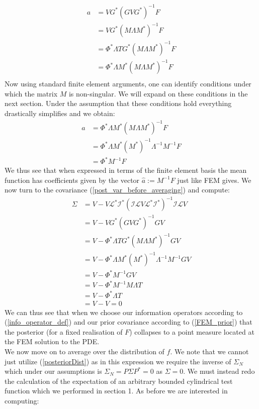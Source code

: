 \documentclass{article}
\theoremstyle{definition}
\theoremstyle{remark}
\begin{document}
\begin{align*}
    a &= VG^{*}(GVG^{*})^{-1}F \\
    &= VG^{*}(M\Lambda M^{*})^{-1}F \\
    &= \Phi^{*}\Lambda TG^{*}(M\Lambda M^{*})^{-1}F \\
    &= \Phi^{*}\Lambda M^{*}(M\Lambda M^{*})^{-1}F \\
\end{align*}
Now using standard finite element arguments, one can identify conditions under which the matrix $M$ is non-singular. We will expand on these conditions in the next section. Under the assumption that these conditions hold everything drastically simplifies and we obtain:
\begin{align*}
    a &= \Phi^{*}\Lambda M^{*}(M\Lambda M^{*})^{-1}F \\
    &= \Phi^{*}\Lambda M^{*}(M^{*})^{-1}\Lambda^{-1}M^{-1}F \\
    &= \Phi^{*}M^{-1}F
\end{align*}
We thus see that when expressed in terms of the finite element basis the mean function has coefficients given by the vector $\hat{a}:=M^{-1}F$ just like FEM gives. We now turn to the covariance (\ref{post_var_before_averaging}) and compute:
\begin{align*}
    \Sigma &= V -V\mathcal{L}^{*}\mathcal{I}^{*}(\mathcal{I}\mathcal{L}V\mathcal{L}^{*}\mathcal{I}^{*})^{-1}\mathcal{I}\mathcal{L}V \\
    &= V - VG^{*}(GVG^{*})^{-1}GV \\
    &= V - \Phi^{*}\Lambda TG^{*}(M\Lambda M^{*})^{-1}GV \\
    &= V - \Phi^{*}\Lambda M^{*}(M^{*})^{-1}\Lambda^{-1}M^{-1}GV \\
    &= V - \Phi^{*}M^{-1}GV \\
    &= V - \Phi^{*}M^{-1}M\Lambda T \\
    &= V - \Phi^{*}\Lambda T \\
    &= V - V = 0
\end{align*}
We can thus see that when we choose our information operators according to (\ref{info_operator_def}) and our prior covariance according to (\ref{FEM_prior}) that the posterior (for a fixed realisation of $F$) collapses to a point measure located at the FEM solution to the PDE. \\

We now move on to average over the distribution of $f$. We note that we cannot just utilize (\ref{posteriorDist}) as in this expression we require the inverse of $\Sigma_{N}$ which under our assumptions is $\Sigma_N=P\Sigma P^{*}=0$ as $\Sigma=0$. We must instead redo the calculation of the expectation of an arbitrary bounded cylindrical test function which we performed in section 1. As before we are interested in computing:
\end{document}
